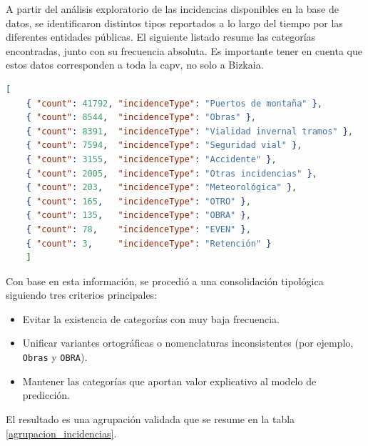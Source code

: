 A partir del análisis exploratorio de las incidencias disponibles en la base de datos, se identificaron distintos tipos reportados a lo largo del tiempo por las diferentes entidades públicas. El siguiente listado resume las categorías encontradas, junto con su frecuencia absoluta. Es importante tener en cuenta que estos datos corresponden a toda la \acrshort{capv}, no solo a Bizkaia.

\begin{lstlisting}[language=json, caption={Frecuencia de incidencias por tipo original}]
	[
	{ "count": 41792, "incidenceType": "Puertos de montaña" },
	{ "count": 8544,  "incidenceType": "Obras" },
	{ "count": 8391,  "incidenceType": "Vialidad invernal tramos" },
	{ "count": 7594,  "incidenceType": "Seguridad vial" },
	{ "count": 3155,  "incidenceType": "Accidente" },
	{ "count": 2005,  "incidenceType": "Otras incidencias" },
	{ "count": 203,   "incidenceType": "Meteorológica" },
	{ "count": 165,   "incidenceType": "OTRO" },
	{ "count": 135,   "incidenceType": "OBRA" },
	{ "count": 78,    "incidenceType": "EVEN" },
	{ "count": 3,     "incidenceType": "Retención" }
	]
\end{lstlisting}

Con base en esta información, se procedió a una consolidación tipológica siguiendo tres criterios principales:

\begin{itemize}
	\item Evitar la existencia de categorías con muy baja frecuencia.
	\item Unificar variantes ortográficas o nomenclaturas inconsistentes (por ejemplo, \texttt{Obras} y \texttt{OBRA}).
	\item Mantener las categorías que aportan valor explicativo al modelo de predicción.
\end{itemize}

El resultado es una agrupación validada que se resume en la tabla \ref{agrupacion_incidencias}.

